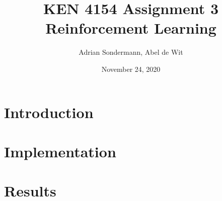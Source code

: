 \documentclass[11pt]{article}
\title{\Large KEN 4154 Assignment 3 \\ \normalsize Reinforcement Learning}
\author{Adrian Sondermann, Abel de Wit}
\date{November 24, 2020}
\begin{document}
\maketitle

\section{Introduction}

\section{Implementation}
\section{Results}
\end{document}
